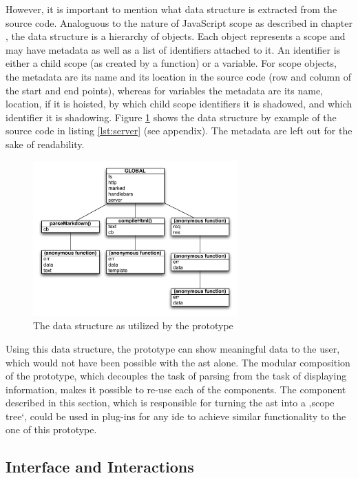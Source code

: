 However, it is important to mention what data structure is extracted
from the source code. Analoguous to the nature of JavaScript scope as
described in chapter , the data structure is a
hierarchy of objects. Each object represents a scope and may have
metadata as well as a list of identifiers attached to it. An identifier
is either a child scope (as created by a function) or a variable. For
scope objects, the metadata are its name and its location in the source
code (row and column of the start and end points), whereas for variables
the metadata are its name, location, if it is hoisted, by which child
scope identifiers it is shadowed, and which identifier it is shadowing.
Figure \ref{fig:scope} shows the data structure by example of the source
code in listing \ref{lst:server} (see appendix). The metadata are left
out for the sake of readability.

\begin{figure}[htbp]
\centering
\includegraphics[keepaspectratio,width=0.7\textwidth]{img/scope.pdf}
\caption{The data structure as utilized by the prototype}
\label{fig:scope}
\end{figure}

Using this data structure, the prototype can show meaningful data to the
user, which would not have been possible with the \ac{ast} alone. The
modular composition of the prototype, which decouples the task of
parsing from the task of displaying information, makes it possible to
re-use each of the components. The component described in this section,
which is responsible for turning the \ac{ast} into a ‚scope tree‘, could
be used in plug-ins for any \ac{ide} to achieve similar functionality to
the one of this prototype.

\subsection{Interface and
Interactions}\label{interface-and-interactions}

